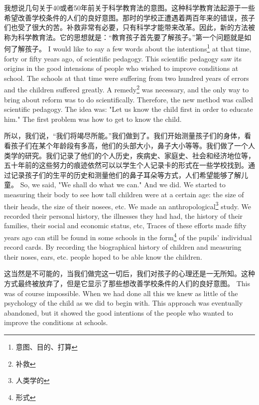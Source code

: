 \documentclass[lang=cn,10pt]{elegantbook}
\begin{document}
\begin{tcolorbox}[title=译文,
colback=red!5!white,
colframe=red!75!black,
fonttitle=\bfseries]
我想说几句关于40或者50年前关于科学教育法的意图。这种科学教育法起源于一些希望改善学校条件的人们的良好意图。那时的学校正遭遇着两百年来的错误，孩子们也受了很大的苦。补救非常有必要，只有科学才能带来改革。因此，新的方法被称为科学教育法。它的思想就是：“教育孩子首先要了解孩子。”第一个问题就是如何了解孩子。
I would like to say a few words about the intentions\footnote{意图、目的、打算} at that time, forty or fifty years ago, of scientific pedagogy. This scientific pedagogy saw its origins in the good intensions of people who wished to improve conditions at school. The schools at that time were suffering from two hundred years of errors and the children suffered greatly. A remedy\footnote{补救} was necessary, and the only way to bring about reform was to do scientifically. Therefore, the new method was called scientific pedagogy. The idea was: "Let us know the child first in order to educate him." The first problem was how to get to know the child.
\end{tcolorbox}

\begin{tcolorbox}[title=译文,
colback=red!5!white,
colframe=red!75!black,
fonttitle=\bfseries]
所以，我们说，“我们将竭尽所能。”我们做到了。我们开始测量孩子们的身体，看看孩子们在某个年龄段有多高，他们的头部大小，鼻子大小等等。我们做了一个人类学的研究。我们记录了他们的个人历史，疾病史、家庭史、社会和经济地位等，五十年前的这些努力的痕迹依然可以以学生个人记录卡的形式在一些学校找到。通过记录孩子们的生平的历史和测量他们的鼻子耳朵等方式，人们希望能够了解儿童。
So, we said, "We shall do what we can." And we did. We started to measuring their body to see how tall children were at a certain age: the size of their heads, the size of their nosees, etc. We made an anthropological\footnote{人类学的} study. We recorded their personal history, the illnesses they had had, the history of their families, their social and economic status, etc, Traces of these efforts made fifty years ago can still be found in some schools in the form\footnote{形式} of the pupils' individual record cards. By recording the biographical history of children and measuring their noses, ears, etc. people hoped to be able know the children.
\end{tcolorbox}

\begin{tcolorbox}[title=译文,
colback=red!5!white,
colframe=red!75!black,
fonttitle=\bfseries]
这当然是不可能的，当我们做完这一切后，我们对孩子的心理还是一无所知。这种方式最终被放弃了，但是它显示了那些想改善学校条件的人们的良好意图。
This was of course impossible. When we had done all this we knew as little of the psychology of the child as we did to begin with. This approach was eventually abandoned, but it showed the good intentions of the people who wanted to improve the conditions at schools.
\end{tcolorbox}
\end{document}
